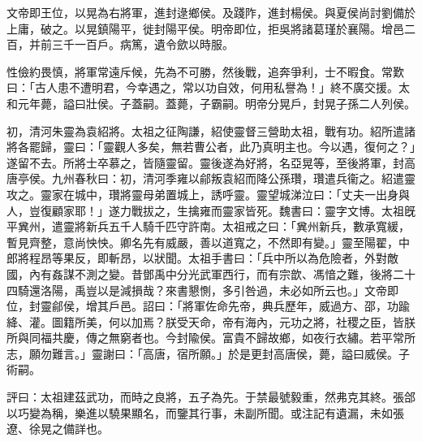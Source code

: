 \begin{pinyinscope}
文帝即王位，以晃為右將軍，進封逯鄉侯。及踐阼，進封楊侯。與夏侯尚討劉備於上庸，破之。以晃鎮陽平，徙封陽平侯。明帝即位，拒吳將諸葛瑾於襄陽。增邑二百，并前三千一百戶。病篤，遺令歛以時服。

性儉約畏慎，將軍常遠斥候，先為不可勝，然後戰，追奔爭利，士不暇食。常歎曰：「古人患不遭明君，今幸遇之，常以功自效，何用私譽為！」終不廣交援。太和元年薨，謚曰壯侯。子蓋嗣。蓋薨，子霸嗣。明帝分晃戶，封晃子孫二人列侯。

初，清河朱靈為袁紹將。太祖之征陶謙，紹使靈督三營助太祖，戰有功。紹所遣諸將各罷歸，靈曰：「靈觀人多矣，無若曹公者，此乃真明主也。今以遇，復何之？」遂留不去。所將士卒慕之，皆隨靈留。靈後遂為好將，名亞晃等，至後將軍，封高唐亭侯。九州春秋曰：初，清河季雍以鄃叛袁紹而降公孫瓚，瓚遣兵衞之。紹遣靈攻之。靈家在城中，瓚將靈母弟置城上，誘呼靈。靈望城涕泣曰：「丈夫一出身與人，豈復顧家耶！」遂力戰拔之，生擒雍而靈家皆死。魏書曰：靈字文博。太祖旣平兾州，遣靈將新兵五千人騎千匹守許南。太祖戒之曰：「兾州新兵，數承寬緩，暫見齊整，意尚怏怏。卿名先有威嚴，善以道寬之，不然即有變。」靈至陽翟，中郎將程昂等果反，即斬昂，以狀聞。太祖手書曰：「兵中所以為危險者，外對敵國，內有姦謀不測之變。昔鄧禹中分光武軍西行，而有宗歆、馮愔之難，後將二十四騎還洛陽，禹豈以是減損哉？來書懇惻，多引咎過，未必如所云也。」文帝即位，封靈鄃侯，增其戶邑。詔曰：「將軍佐命先帝，典兵歷年，威過方、邵，功踰絳、灌。圖籍所美，何以加焉？朕受天命，帝有海內，元功之將，社稷之臣，皆朕所與同福共慶，傳之無窮者也。今封隃侯。富貴不歸故鄉，如夜行衣繡。若平常所志，願勿難言。」靈謝曰：「高唐，宿所願。」於是更封高唐侯，薨，謚曰威侯。子術嗣。

評曰：太祖建茲武功，而時之良將，五子為先。于禁最號毅重，然弗克其終。張郃以巧變為稱，樂進以驍果顯名，而鑒其行事，未副所聞。或注記有遺漏，未如張遼、徐晃之備詳也。


\end{pinyinscope}